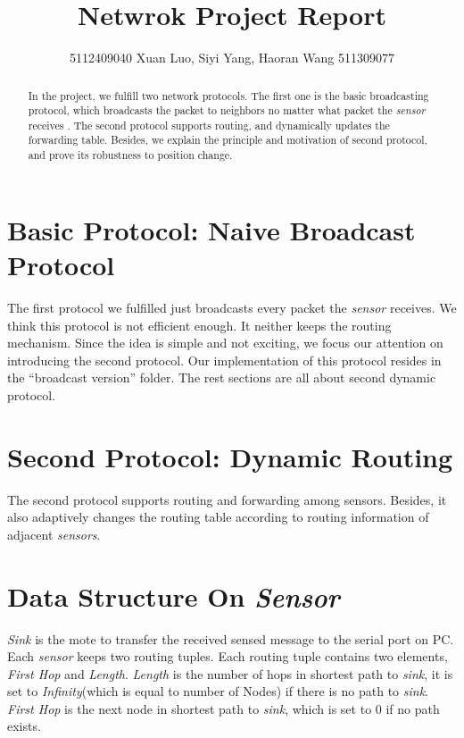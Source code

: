 \documentclass[a4paper]{article}
\begin{document}
\title{Netwrok Project Report}

\author{5112409040 Xuan Luo, Siyi Yang, Haoran Wang 511309077}

\maketitle

\begin{abstract}
In the project, we fulfill two network protocols. The first one is the basic broadcasting protocol, which broadcasts the packet to neighbors no matter what packet the \emph{sensor} receives . The second protocol supports routing, and dynamically updates the forwarding table. Besides, we explain the principle and motivation of second protocol, and prove its robustness to position change.
\end{abstract}

\section{Basic Protocol: Naive Broadcast Protocol}
The first protocol we fulfilled just broadcasts every packet the \emph{sensor} receives. We think this protocol is not efficient enough. It neither keeps the routing mechanism. Since the idea is simple and not exciting, we focus our attention on introducing the second protocol. Our implementation of this protocol resides in the ``broadcast version'' folder. The rest sections are all about second dynamic protocol.

\section{Second Protocol: Dynamic Routing}
The second protocol supports routing and forwarding among sensors. Besides, it also adaptively changes the routing table according to routing information of adjacent \emph{sensors}.

\section{Data Structure On \emph{Sensor}}
\emph{Sink} is the mote to transfer the received sensed message to the serial port on PC.
Each \emph{sensor} keeps two routing tuples. Each routing tuple contains two elements, \emph{First Hop} and \emph{Length}. \emph{Length} is the number of hops in shortest path to \emph{sink}, it is set to \emph{Infinity}(which is equal to number of Nodes) if there is no path to \emph{sink}. \emph{First Hop} is the next node in shortest path to \emph{sink}, which is set to 0 if no path exists.
\end{document}
